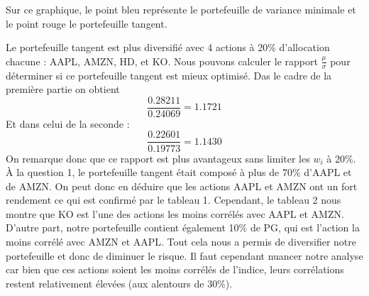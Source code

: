 \documentclass[
]{article}
\begin{document}
Sur ce graphique, le point bleu représente le portefeuille de variance
minimale et le point rouge le portefeuille tangent.

Le portefeuille tangent est plus diversifié avec 4 actions à 20\%
d'allocation chacune : AAPL, AMZN, HD, et KO. Nous pouvons calculer le
rapport \(\frac{\mu}{\sigma}\) pour déterminer si ce portefeuille
tangent est mieux optimisé. Das le cadre de la première partie on
obtient \[\frac{0.28211}{0.24069}=1.1721\] Et dans celui de la seconde :
\[\frac{0.22601}{0.19773}=1.1430\] On remarque donc que ce rapport est
plus avantageux sans limiter les \(w_i\) à 20\%. À la question 1, le
portefeuille tangent était composé à plus de 70\% d'AAPL et de AMZN. On
peut donc en déduire que les actions AAPL et AMZN ont un fort rendement
ce qui est confirmé par le tableau 1. Cependant, le tableau 2 nous
montre que KO est l'une des actions les moins corrélés avec AAPL et
AMZN. D'autre part, notre portefeuille contient également 10\% de PG,
qui est l'action la moins corrélé avec AMZN et AAPL. Tout cela nous a
permis de diversifier notre portefeuille et donc de diminuer le risque.
Il faut cependant nuancer notre analyse car bien que ces actions soient
les moins corrélés de l'indice, leurs corrélations restent relativement
élevées (aux alentours de 30\%).
\end{document}
